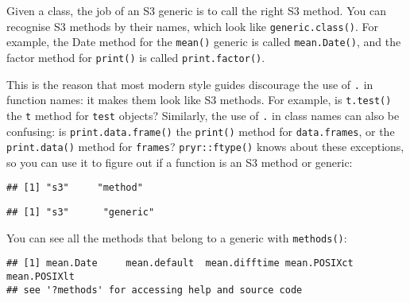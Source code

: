 Given a class, the job of an S3 generic is to call the right S3 method.
You can recognise S3 methods by their names, which look like
\texttt{generic.class()}. For example, the Date method for the
\texttt{mean()} generic is called \texttt{mean.Date()}, and the factor
method for \texttt{print()} is called \texttt{print.factor()}.
 

This is the reason that most modern style guides discourage the use of
\texttt{.} in function names: it makes them look like S3 methods. For
example, is \texttt{t.test()} the \texttt{t} method for \texttt{test}
objects? Similarly, the use of \texttt{.} in class names can also be
confusing: is \texttt{print.data.frame()} the \texttt{print()} method
for \texttt{data.frames}, or the \texttt{print.data()} method for
\texttt{frames}? \texttt{pryr::ftype()} knows about these exceptions, so
you can use it to figure out if a function is an S3 method or generic:

\begin{Shaded}
\begin{Highlighting}[]
\end{Highlighting}
\end{Shaded}

\begin{verbatim}
## [1] "s3"     "method"
\end{verbatim}

\begin{Shaded}
\begin{Highlighting}[]
\end{Highlighting}
\end{Shaded}

\begin{verbatim}
## [1] "s3"      "generic"
\end{verbatim}

You can see all the methods that belong to a generic with
\texttt{methods()}:

\begin{Shaded}
\begin{Highlighting}[]
\NormalTok{(}\NormalTok{)}
\end{Highlighting}
\end{Shaded}

\begin{verbatim}
## [1] mean.Date     mean.default  mean.difftime mean.POSIXct  mean.POSIXlt 
## see '?methods' for accessing help and source code
\end{verbatim}

